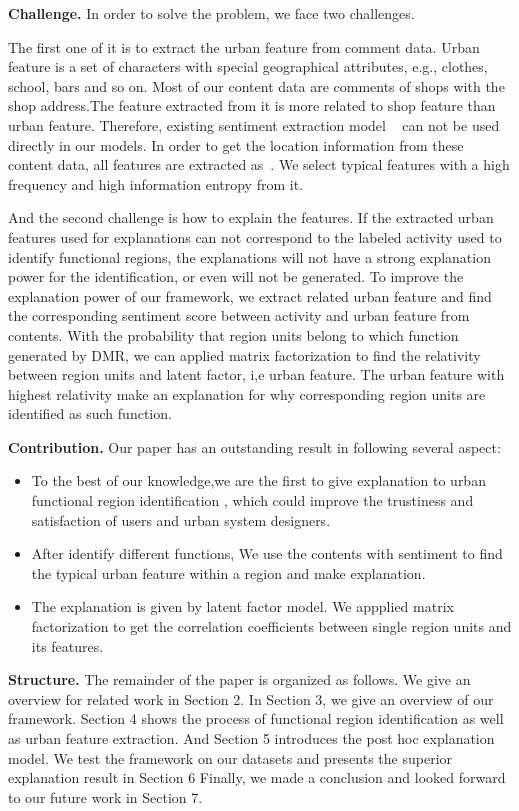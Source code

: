 \documentclass[runningheads]{llncs}
\begin{document}
\textbf{Challenge.}
In order to solve the problem, we face two challenges.

The first one of it is to extract the urban feature from comment data.
Urban feature is a set of characters with special geographical attributes, e.g., clothes, school, bars and so on.
Most of our content data are comments of shops with the shop address.The feature extracted from it is more related to shop feature than urban feature.
Therefore, existing sentiment extraction model ~\cite{Lu2011Label} can not be used directly in our models.%
In order to get the location information from these content data, all features are extracted as~\cite{Zhang2015Sentires}.
We select typical features with a high frequency and high information entropy from it.

And the second challenge is how to explain the features.
If the extracted urban features used for explanations can not correspond to the labeled activity used to identify functional regions, the explanations will not have a strong explanation power for the identification, or even will not be generated.
To improve the explanation power of our framework, we extract related urban feature and find the corresponding sentiment score between activity and urban feature from contents.
With the probability that region units belong to which function generated by DMR, we can applied matrix factorization to find the relativity between region units and latent factor, i,e urban feature.
The urban feature with highest relativity make an explanation for why corresponding region units are identified as such function.


\textbf{Contribution.}
Our paper has an outstanding result in following several aspect:
\begin{itemize}
  \item To the best of our knowledge,we are the first to give explanation to urban functional region identification , which could improve the trustiness and satisfaction of users and urban system designers.
  \item After identify different functions, We use the contents with sentiment to find the typical urban feature within a region and make explanation.
  \item The explanation is given by latent factor model. We appplied matrix factorization to get the correlation coefficients between single region units and its features.
\end{itemize}


\textbf{Structure.}
The remainder of the paper is organized as follows.
We give an overview for related work in Section 2.
In Section 3, we give an overview of our framework.
Section 4 shows the process of functional region identification as well as urban feature extraction.
And Section 5 introduces the post hoc explanation model.
We test the framework on our datasets and presents the superior explanation result in Section 6
Finally, we made a conclusion and looked forward to our future work in Section 7.
\end{document}
